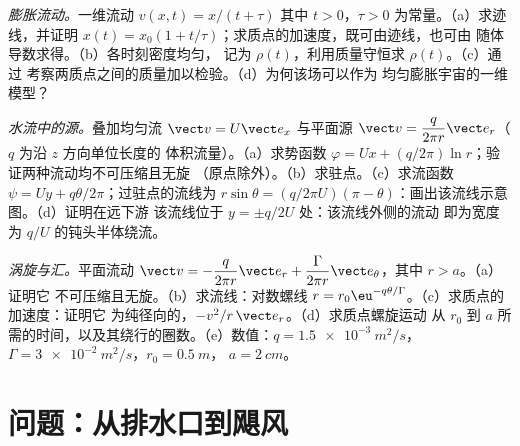 \begin{exercise}[$\star\star\star$]\label{exo:b2:fluid-kinematics:10}
\emph{膨胀流动。}一维流动 $v(x, t) = x/(t + \tau)$
其中 $t > 0$，$\tau > 0$ 为常量。（a）求迹线，并证明 $x(t) = x_0(1 +
t/\tau)$；求质点的加速度，既可由迹线，也可由
随体导数求得。（b）各时刻密度均匀，
记为 $\rho(t)$，利用质量守恒求 $\rho(t)$。（c）通过
考察两质点之间的质量加以检验。（d）为何该场可以作为
均匀膨胀宇宙的一维模型？
\end{exercise}

\begin{exercise}[$\star\star\star$]\label{exo:b2:fluid-kinematics:11}
\emph{水流中的源。}叠加均匀流 $\vect v = U\vect e_x$
与平面源 $\vect v = \dfrac{q}{2\pi r}\vect e_r$（$q$ 为沿 $z$ 方向单位长度的
体积流量）。（a）求势函数 $\varphi = Ux +
(q/2\pi)\ln r$；验证两种流动均不可压缩且无旋
（原点除外）。（b）求驻点。（c）求流函数 $\psi
= Uy + q\theta/2\pi$；过驻点的流线为
$r\sin\theta = (q/2\pi U)(\pi - \theta)$：画出该流线示意图。（d）证明在远下游
该流线位于 $y = \pm q/2U$ 处：该流线外侧的流动
即为宽度为 $q/U$ 的钝头半体绕流。
\end{exercise}

\begin{exercise}[$\star\star\star$]\label{exo:b2:fluid-kinematics:12}
\emph{涡旋与汇。}平面流动 $\vect v = -\dfrac{q}{2\pi r}\vect e_r +
\dfrac{\Gamma}{2\pi r}\vect e_\theta$，其中 $r > a$。（a）证明它
不可压缩且无旋。（b）求流线：对数螺线
$r = r_0\eu^{-q\theta/\Gamma}$。（c）求质点的加速度：证明它
为纯径向的，$-v^2/r\,\vect e_r$。（d）求质点螺旋运动
从 $r_0$ 到 $a$ 所需的时间，以及其绕行的圈数。（e）数值：$q =
\qty{1.5e-3}{m^2/s}$，$\Gamma = \qty{3e-2}{m^2/s}$，$r_0 = \qty{0.5}{m}$，
$a = \qty{2}{cm}$。
\end{exercise}

\section{问题：从排水口到飓风}

